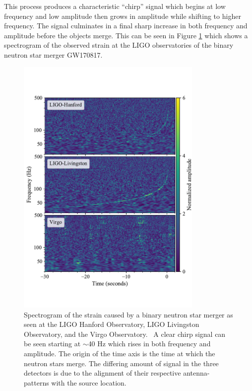 \documentclass [12pt, proquest]{uwthesis}[2019]
\begin{document}
This process produces a characteristic ``chirp'' signal which begins at low frequency and low amplitude then grows in amplitude while shifting to higher frequency. The signal culminates in a final sharp increase in both frequency and amplitude before the objects merge. This can be seen in Figure \ref{GW170817} which shows a spectrogram of the observed strain at the LIGO observatories of the binary neutron star merger GW170817.
 
\begin{figure}
\begin{center}
\includegraphics[width=0.8\textwidth]{GW170817.pdf}
\caption[Spectrogram of the strain caused by a binary neutron star merger]{Spectrogram of the strain caused by a binary neutron star merger as seen at the LIGO Hanford Observatory, LIGO Livingston Observatory, and the Virgo Observatory.~\cite{GW170817} A clear chirp signal can be seen starting at $\sim$40 Hz which rises in both frequency and amplitude. The origin of the time axis is the time at which the neutron stars merge. The differing amount of signal in the three detectors is due to the alignment of their respective antenna-patterns with the source location.}
\label{GW170817}
\end{center}
\end{figure}
 
\end{document}
